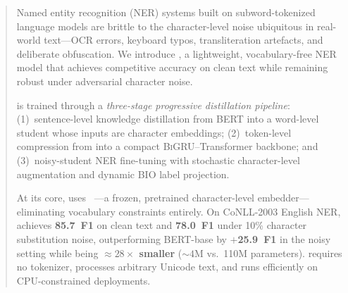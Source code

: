 \begin{abstract}
Named entity recognition (NER) systems built on subword-tokenized language
models are brittle to the character-level noise ubiquitous in real-world
text---OCR errors, keyboard typos, transliteration artefacts, and deliberate
obfuscation.  We introduce \LightRet{}, a lightweight, vocabulary-free NER
model that achieves competitive accuracy on clean text while remaining robust
under adversarial character noise.

\LightRet{} is trained through a \emph{three-stage progressive distillation
pipeline}: (1)~sentence-level knowledge distillation from \textsc{BERT} into
a word-level \RetBERT{} student whose inputs are character embeddings;
(2)~token-level compression from \RetBERT{} into a compact
\textsc{BiGRU}--Transformer backbone; and (3)~noisy-student NER fine-tuning
with stochastic character-level augmentation and dynamic BIO label projection.

At its core, \LightRet{} uses \RetVec{}~\citep{sander2023retvec}---a frozen,
pretrained character-level embedder---eliminating vocabulary constraints
entirely.  On CoNLL-2003 English NER, \LightRet{} achieves
\textbf{85.7~F1} on clean text and \textbf{78.0~F1} under 10\%
character substitution noise, outperforming BERT-base by
\textbf{$+$25.9~F1} in the noisy setting while being
\textbf{\(\approx28{\times}\) smaller} (${\sim}4$M vs.\ 110M parameters).
\LightRet{} requires no tokenizer, processes arbitrary Unicode text, and runs
efficiently on CPU-constrained deployments.
\end{abstract}
